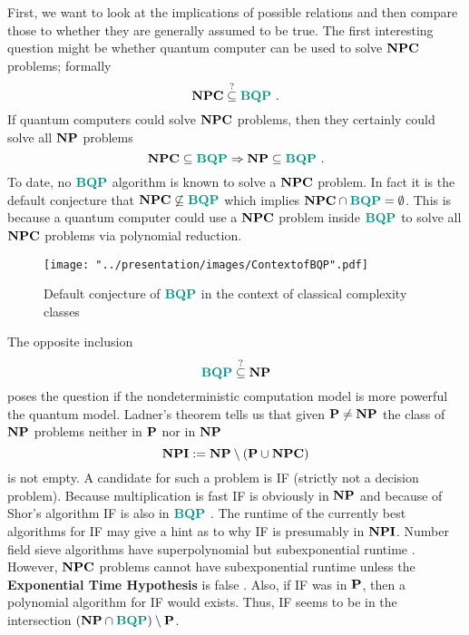 First, we want to look at the implications of possible relations and then compare those to whether they are generally assumed to be true.
The first interesting question might be whether quantum computer can be used to solve $\NPC$ problems; formally
\begin{equation*}
    \NPC\overset{?}{\subseteq}\BQP
    \ .
\end{equation*}
If quantum computers could solve $\NPC$ problems, then they certainly could solve all $\NP$ problems
\begin{equation}
    \NPC\subseteq\BQP
    \Rightarrow
    \NP\subseteq\BQP
    \ .
\end{equation}
To date, no $\BQP$ algorithm is known to solve a $\NPC$ problem.
In fact it is the default conjecture that $\NPC\not\subseteq\BQP$ which implies $\NPC\cap\BQP=\emptyset$.
This is because a quantum computer could use a $\NPC$ problem inside $\BQP$ to solve all $\NPC$ problems via polynomial reduction.

\begin{figure}[t!]
\centering
\texttt{[image: "../presentation/images/ContextofBQP".pdf]}
\caption{Default conjecture of $\BQP$ in the context of classical complexity classes}
\label{fig:overview}
\end{figure}

The opposite inclusion
\begin{equation*}
    \BQP\overset{?}{\subseteq}\NP
\end{equation*}
poses the question if the nondeterministic computation model is more powerful the quantum model.
Ladner's theorem tells us that given $\P\neq\NP$ the class of $\NP$ problems neither in $\P$ nor in $\NP$
\begin{equation*}
    \NPI:=\NP\setminus(\P\cup\NPC)
\end{equation*}
is not empty.
A candidate for such a problem is \ac{IF} (strictly not a decision problem).
Because multiplication is fast \ac{IF} is obviously in $\NP$ and because of Shor's algorithm \ac{IF} is also in $\BQP$ \cite{shor_1997}.
The runtime of the currently best algorithms for \ac{IF} may give a hint as to why \ac{IF} is presumably in $\NPI$.
Number field sieve algorithms have superpolynomial but subexponential runtime \cite{pomerance_1996}.
However, $\NPC$ problems cannot have subexponential runtime unless the \textbf{Exponential Time Hypothesis} is false \cite{impagliazzo_paturi_1999}.
Also, if \ac{IF} was in $\P$, then a polynomial algorithm for \ac{IF} would exists.
Thus, \ac{IF} seems to be in the intersection $(\NP\cap\BQP)\setminus\P$.

